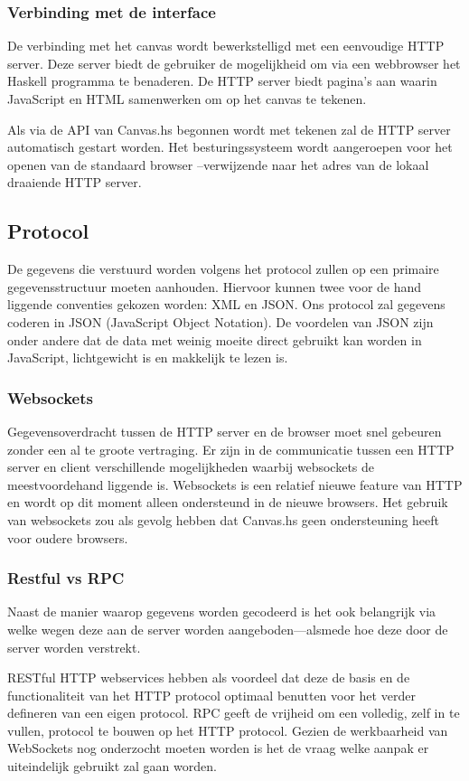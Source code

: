 \subsubsection{Verbinding met de interface}
De verbinding met het canvas wordt bewerkstelligd met een eenvoudige HTTP server. Deze server biedt de gebruiker de mogelijkheid om via een webbrowser het Haskell programma te benaderen. De HTTP server biedt pagina's aan waarin JavaScript en HTML samenwerken om op het canvas te tekenen.

Als via de API van Canvas.hs begonnen wordt met tekenen zal de HTTP server automatisch gestart worden. Het besturingssysteem wordt aangeroepen voor het openen van de standaard browser --verwijzende naar het adres van de lokaal draaiende HTTP server.
\subsection{Protocol}
De gegevens die verstuurd worden volgens het protocol zullen op een primaire gegevensstructuur moeten aanhouden. Hiervoor kunnen twee voor de hand liggende conventies gekozen worden: XML en JSON. Ons protocol zal gegevens coderen in JSON (JavaScript Object Notation). De voordelen van JSON zijn onder andere dat de data met weinig moeite direct gebruikt kan worden in JavaScript, lichtgewicht is en makkelijk te lezen is.
\subsubsection{Websockets}
Gegevensoverdracht tussen de HTTP server en de browser moet snel gebeuren zonder een al te groote vertraging. Er zijn in de communicatie tussen een HTTP server en client verschillende mogelijkheden waarbij websockets de meestvoordehand liggende is. Websockets is een relatief nieuwe feature van HTTP en wordt op dit moment alleen ondersteund in de nieuwe browsers. Het gebruik van websockets zou als gevolg hebben dat Canvas.hs geen ondersteuning heeft voor oudere browsers.
\subsubsection{Restful vs RPC}
Naast de manier waarop gegevens worden gecodeerd is het ook belangrijk via welke wegen deze aan de server worden aangeboden—alsmede hoe deze door de server worden verstrekt.

RESTful HTTP webservices hebben als voordeel dat deze de basis en de functionaliteit van het HTTP protocol optimaal benutten voor het verder defineren van een eigen protocol. RPC geeft de vrijheid om een volledig, zelf in te vullen, protocol te bouwen op het HTTP protocol. Gezien de werkbaarheid van WebSockets nog onderzocht moeten worden is het de vraag welke aanpak er uiteindelijk gebruikt zal gaan worden.

